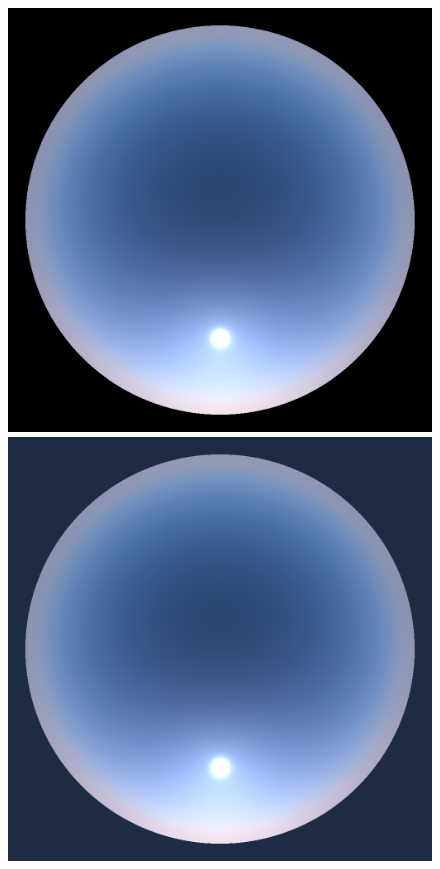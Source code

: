 \begin{figure}
{ }
 \subtop
 {
 \includegraphics[scale=0.125]{figures/preetham_solar_disk_2.png}
 }
 \subtop
 {
 \includegraphics[scale=0.125]{figures/preetham_solar_disk_irradiance_2.png}
}
\end{figure}
